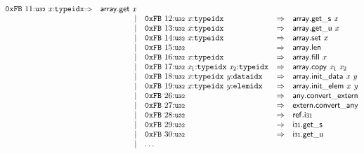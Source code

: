 $$\begin{array}{@{}l@{}rrlll@{}l@{}}
\mathtt{0xFB}~11{:}{\mathtt{u{\scriptstyle32}}}~{\mathit{x}}{:}{\mathtt{typeidx}} &\Rightarrow& \mathsf{array.get}~{\mathit{x}} \\ &&|&
\mathtt{0xFB}~12{:}{\mathtt{u{\scriptstyle32}}}~{\mathit{x}}{:}{\mathtt{typeidx}} &\Rightarrow& {{\mathsf{array.get}}{\mathsf{\_}}}{\mathsf{s}}~{\mathit{x}} \\ &&|&
\mathtt{0xFB}~13{:}{\mathtt{u{\scriptstyle32}}}~{\mathit{x}}{:}{\mathtt{typeidx}} &\Rightarrow& {{\mathsf{array.get}}{\mathsf{\_}}}{\mathsf{u}}~{\mathit{x}} \\ &&|&
\mathtt{0xFB}~14{:}{\mathtt{u{\scriptstyle32}}}~{\mathit{x}}{:}{\mathtt{typeidx}} &\Rightarrow& \mathsf{array.set}~{\mathit{x}} \\ &&|&
\mathtt{0xFB}~15{:}{\mathtt{u{\scriptstyle32}}} &\Rightarrow& \mathsf{array.len} \\ &&|&
\mathtt{0xFB}~16{:}{\mathtt{u{\scriptstyle32}}}~{\mathit{x}}{:}{\mathtt{typeidx}} &\Rightarrow& \mathsf{array.fill}~{\mathit{x}} \\ &&|&
\mathtt{0xFB}~17{:}{\mathtt{u{\scriptstyle32}}}~{\mathit{x}}_{{1}}{:}{\mathtt{typeidx}}~{\mathit{x}}_{{2}}{:}{\mathtt{typeidx}} &\Rightarrow& \mathsf{array.copy}~{\mathit{x}}_{{1}}~{\mathit{x}}_{{2}} \\ &&|&
\mathtt{0xFB}~18{:}{\mathtt{u{\scriptstyle32}}}~{\mathit{x}}{:}{\mathtt{typeidx}}~{\mathit{y}}{:}{\mathtt{dataidx}} &\Rightarrow& \mathsf{array.init\_data}~{\mathit{x}}~{\mathit{y}} \\ &&|&
\mathtt{0xFB}~19{:}{\mathtt{u{\scriptstyle32}}}~{\mathit{x}}{:}{\mathtt{typeidx}}~{\mathit{y}}{:}{\mathtt{elemidx}} &\Rightarrow& \mathsf{array.init\_elem}~{\mathit{x}}~{\mathit{y}} \\ &&|&
\mathtt{0xFB}~26{:}{\mathtt{u{\scriptstyle32}}} &\Rightarrow& \mathsf{any.convert\_extern} \\ &&|&
\mathtt{0xFB}~27{:}{\mathtt{u{\scriptstyle32}}} &\Rightarrow& \mathsf{extern.convert\_any} \\ &&|&
\mathtt{0xFB}~28{:}{\mathtt{u{\scriptstyle32}}} &\Rightarrow& \mathsf{ref.i{\scriptstyle31}} \\ &&|&
\mathtt{0xFB}~29{:}{\mathtt{u{\scriptstyle32}}} &\Rightarrow& {{\mathsf{i{\scriptstyle31}.get}}{\mathsf{\_}}}{\mathsf{s}} \\ &&|&
\mathtt{0xFB}~30{:}{\mathtt{u{\scriptstyle32}}} &\Rightarrow& {{\mathsf{i{\scriptstyle31}.get}}{\mathsf{\_}}}{\mathsf{u}} \\ &&|&
\dots \\
\end{array}
$$

